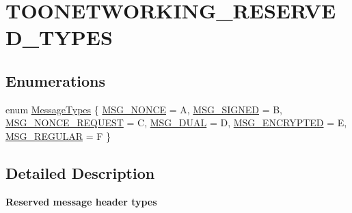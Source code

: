 \hypertarget{group__TOONETWORKING__RESERVED__TYPES}{}\section{T\+O\+O\+N\+E\+T\+W\+O\+R\+K\+I\+N\+G\+\_\+\+R\+E\+S\+E\+R\+V\+E\+D\+\_\+\+T\+Y\+P\+ES}
\label{group__TOONETWORKING__RESERVED__TYPES}
\subsection*{Enumerations}
\begin{DoxyCompactItemize}
\item 
enum \hyperlink{group__TOONETWORKING__RESERVED__TYPES_ga8a71ab4395ca4331fc50559eb1127e76}{Message\+Types} \{ \newline
\hyperlink{group__TOONETWORKING__RESERVED__TYPES_gga8a71ab4395ca4331fc50559eb1127e76ad5c46e5b7ec0dba6e94d65bc86858d7c}{M\+S\+G\+\_\+\+N\+O\+N\+CE} = \textquotesingle{}A\textquotesingle{}, 
\hyperlink{group__TOONETWORKING__RESERVED__TYPES_gga8a71ab4395ca4331fc50559eb1127e76a8d265ec37da8534c760f2fee6a8c64fb}{M\+S\+G\+\_\+\+S\+I\+G\+N\+ED} = \textquotesingle{}B\textquotesingle{}, 
\hyperlink{group__TOONETWORKING__RESERVED__TYPES_gga8a71ab4395ca4331fc50559eb1127e76a97fc08aa67e7764cea7da63a1f79337a}{M\+S\+G\+\_\+\+N\+O\+N\+C\+E\+\_\+\+R\+E\+Q\+U\+E\+ST} = \textquotesingle{}C\textquotesingle{}, 
\hyperlink{group__TOONETWORKING__RESERVED__TYPES_gga8a71ab4395ca4331fc50559eb1127e76a972f68fcfa03e7af55204cd68d7049ea}{M\+S\+G\+\_\+\+D\+U\+AL} = \textquotesingle{}D\textquotesingle{}, 
\newline
\hyperlink{group__TOONETWORKING__RESERVED__TYPES_gga8a71ab4395ca4331fc50559eb1127e76ae4de076a3523014f7456aecbd1a4022c}{M\+S\+G\+\_\+\+E\+N\+C\+R\+Y\+P\+T\+ED} = \textquotesingle{}E\textquotesingle{}, 
\hyperlink{group__TOONETWORKING__RESERVED__TYPES_gga8a71ab4395ca4331fc50559eb1127e76a5fe4109a50f53cfac737c1cc5a7c7a89}{M\+S\+G\+\_\+\+R\+E\+G\+U\+L\+AR} = \textquotesingle{}F\textquotesingle{}
 \}
\end{DoxyCompactItemize}


\subsection{Detailed Description}
{\bfseries Reserved message header types}

